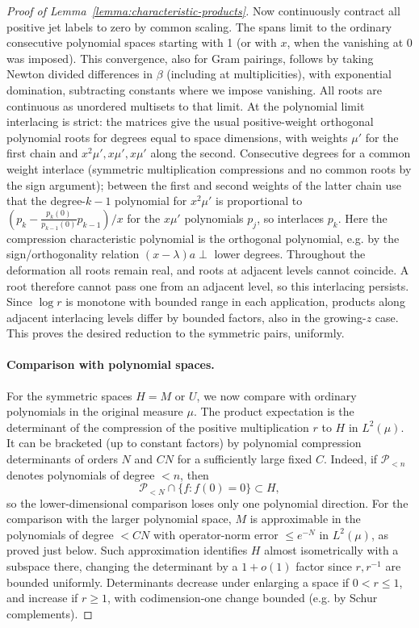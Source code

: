 \begin{proof}[Proof of Lemma~\ref{lemma:characteristic-products}]
Now continuously contract all positive jet labels to zero by common scaling. The spans limit to the ordinary consecutive polynomial spaces starting with 1 (or with $x$, when the vanishing at 0 was imposed). This convergence, also for Gram pairings, follows by taking Newton divided differences in $\beta$ (including at multiplicities), with exponential domination, subtracting constants where we impose vanishing. All roots are continuous as unordered multisets to that limit. At the polynomial limit interlacing is strict: the matrices give the usual positive-weight orthogonal polynomial roots for degrees equal to space dimensions, with weights $\mu'$ for the first chain and $x^2\mu',x\mu',x\mu'$ along the second. Consecutive degrees for a common weight interlace (symmetric multiplication compressions and no common roots by the sign argument); between the first and second weights of the latter chain use that the degree-$k-1$ polynomial for $x^2\mu'$ is proportional to $(p_k-\frac{p_k(0)}{p_{k-1}(0)}p_{k-1})/x$ for the $x\mu'$ polynomials $p_j$, so interlaces $p_k$. Here the compression characteristic polynomial is the orthogonal polynomial, e.g. by the sign/orthogonality relation $(x-\lambda)a\perp$ lower degrees. Throughout the deformation all roots remain real, and roots at adjacent levels cannot coincide. A root therefore cannot pass one from an adjacent level, so this interlacing persists. Since $\log r$ is monotone with bounded range in each application, products along adjacent interlacing levels differ by bounded factors, also in the growing-$z$ case. This proves the desired reduction to the symmetric pairs, uniformly.

\paragraph{Comparison with polynomial spaces.}
For the symmetric spaces $H=M$ or $U$, we now compare with ordinary polynomials in the original measure $\mu$. The product expectation is the determinant of the compression of the positive multiplication $r$ to $H$ in $L^2(\mu)$. It can be bracketed (up to constant factors) by polynomial compression determinants of orders $N$ and $CN$ for a sufficiently large fixed $C$. Indeed, if $\mathcal P_{<n}$ denotes polynomials of degree $<n$, then
\[
 \mathcal P_{<N}\cap\{f:f(0)=0\}\subset H,
\]
so the lower-dimensional comparison loses only one polynomial direction. For the comparison with the larger polynomial space, $M$ is approximable in the polynomials of degree $<CN$ with operator-norm error $\le e^{-N}$ in $L^2(\mu)$, as proved just below. Such approximation identifies $H$ almost isometrically with a subspace there, changing the determinant by a $1+o(1)$ factor since $r,r^{-1}$ are bounded uniformly. Determinants decrease under enlarging a space if $0<r\le1$, and increase if $r\ge1$, with codimension-one change bounded (e.g. by Schur complements).


\end{proof}
